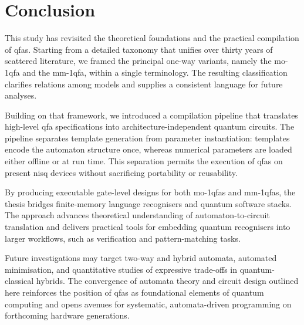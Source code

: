 \chapter{Conclusion}
\label{chap:conclusion}

This study has revisited the theoretical foundations and the practical compilation of \glspl{qfa}. Starting from a detailed taxonomy that unifies over thirty years of scattered literature, we framed the principal one-way variants, namely the \gls{mo-1qfa} and the \gls{mm-1qfa}, within a single terminology. The resulting classification clarifies relations among models and supplies a consistent language for future analyses.

Building on that framework, we introduced a compilation pipeline that translates high-level \gls{qfa} specifications into architecture-independent quantum circuits. The pipeline separates template generation from parameter instantiation: templates encode the automaton structure once, whereas numerical parameters are loaded either offline or at run time. This separation permits the execution of \glspl{qfa} on present \gls{nisq} devices without sacrificing portability or reusability.

By producing executable gate-level designs for both \glspl{mo-1qfa} and \glspl{mm-1qfa}, the thesis bridges finite-memory language recognisers and quantum software stacks. The approach advances theoretical understanding of automaton-to-circuit translation and delivers practical tools for embedding quantum recognisers into larger workflows, such as verification and pattern-matching tasks.

Future investigations may target two-way and hybrid automata, automated minimisation, and quantitative studies of expressive trade-offs in quantum-classical hybrids. The convergence of automata theory and circuit design outlined here reinforces the position of \glspl{qfa} as foundational elements of quantum computing and opens avenues for systematic, automata-driven programming on forthcoming hardware generations.

